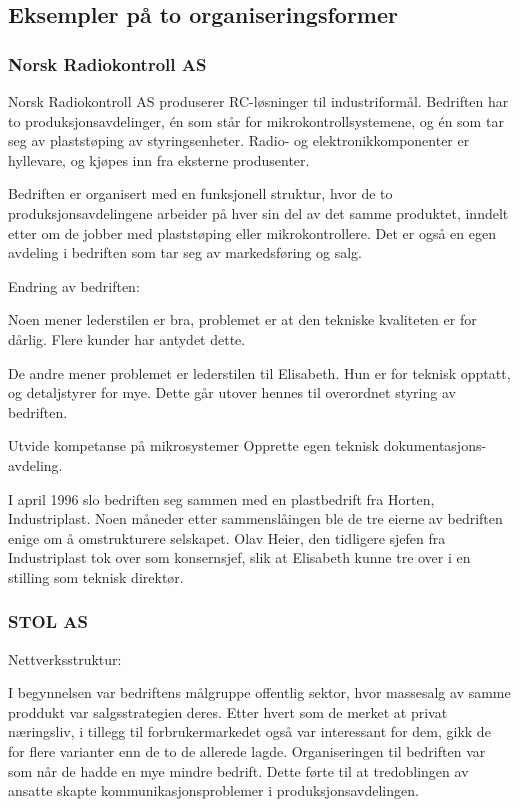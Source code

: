 
\subsection{Eksempler på to organiseringsformer}

\subsubsection{Norsk Radiokontroll AS}


Norsk Radiokontroll AS produserer RC-løsninger til industriformål.
Bedriften har to produksjonsavdelinger, én som står for mikrokontrollsystemene, og én som tar seg av plaststøping av styringsenheter.
Radio- og elektronikkomponenter er hyllevare, og kjøpes inn fra eksterne produsenter.

Bedriften er organisert med en funksjonell struktur, hvor de to produksjonsavdelingene arbeider på hver sin del av det samme produktet, inndelt etter om de jobber med plaststøping eller mikrokontrollere.
Det er også en egen avdeling i bedriften som tar seg av markedsføring og salg.

Endring av bedriften:

Noen mener lederstilen er bra, problemet er at den tekniske kvaliteten er for dårlig.
Flere kunder har antydet dette.

De andre mener problemet er lederstilen til Elisabeth.
Hun er for teknisk opptatt, og detaljstyrer for mye.
Dette går utover hennes til overordnet styring av bedriften.

Utvide kompetanse på mikrosystemer
Opprette egen teknisk dokumentasjons-avdeling.

I april 1996 slo bedriften seg sammen med en plastbedrift fra Horten, Industriplast.
Noen måneder etter sammenslåingen ble de tre eierne av bedriften enige om å omstrukturere selskapet. Olav Heier, den tidligere sjefen fra Industriplast tok over som konsernsjef, slik at Elisabeth kunne tre over i en stilling som teknisk direktør.

\subsubsection{STOL AS}

Nettverksstruktur:

I begynnelsen var bedriftens målgruppe offentlig sektor, hvor massesalg av samme proddukt var salgsstrategien deres. Etter hvert som de merket  at privat næringsliv, i tillegg til forbrukermarkedet også var interessant for dem, gikk de for flere varianter enn de to de allerede lagde. Organiseringen til bedriften var som når de hadde en mye mindre bedrift. Dette førte til at tredoblingen av ansatte skapte kommunikasjonsproblemer i produksjonsavdelingen.

